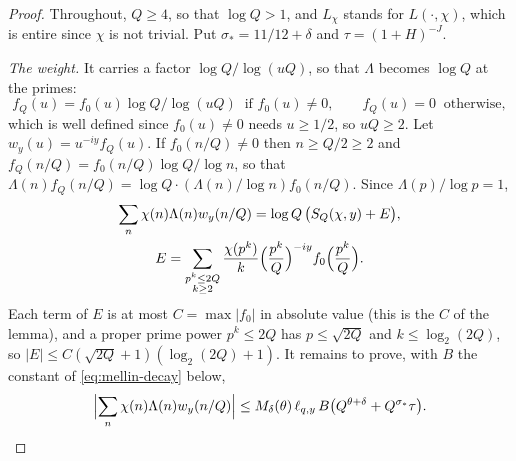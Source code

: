 \documentclass[11pt]{article}
\numberwithin{equation}{section}
\begin{document}
\begin{proof}
Throughout, $Q \ge 4$, so that $\log Q > 1$, and $L_\chi$ stands for $L(\cdot, \chi)$, which is entire since $\chi$ is
not trivial. Put $\sigma_* = 11/12 + \delta$ and $\tau = (1 + H)^{-J}$.

\emph{The weight.} It carries a factor $\log Q/\log(uQ)$, so that $\Lambda$ becomes $\log Q$ at the primes:
\[
  f_Q(u) = f_0(u) \log Q/\log(uQ) \ \text{ if } f_0(u) \ne 0, \qquad f_Q(u) = 0 \ \text{ otherwise},
\]
which is well defined since $f_0(u) \ne 0$ needs $u \ge 1/2$, so $uQ \ge 2$. Let $w_y(u) = u^{-iy} f_Q(u)$. If
$f_0(n/Q) \ne 0$ then $n \ge Q/2 \ge 2$ and $f_Q(n/Q) = f_0(n/Q) \log Q/\log n$, so that
$\Lambda(n) f_Q(n/Q) = \log Q \cdot (\Lambda(n)/\log n) f_0(n/Q)$. Since $\Lambda(p)/\log p = 1$,
\begin{gather*}
  \sum_n \chi(n) \Lambda(n) w_y(n/Q) = \log Q \, \bigl(S_Q(\chi, y) + E\bigr), \\
  E = \sum_{\substack{p^k \le 2Q \\ k \ge 2}} \frac{\chi(p^k)}{k} \Bigl(\frac{p^k}{Q}\Bigr)^{-iy}
  f_0\Bigl(\frac{p^k}{Q}\Bigr).
\end{gather*}
Each term of $E$ is at most $C = \max |f_0|$ in absolute value (this is the $C$ of the lemma), and a proper prime
power $p^k \le 2Q$ has $p \le \sqrt{2Q}$ and $k \le \log_2(2Q)$, so $|E| \le C(\sqrt{2Q} + 1)(\log_2(2Q) + 1)$. It
remains to prove, with $B$ the constant of \eqref{eq:mellin-decay} below,
\begin{equation}\label{eq:Sw-bound}
  \Bigl|\sum_n \chi(n) \Lambda(n) w_y(n/Q)\Bigr| \le M_\delta(\theta) \, \ell_{q, y} \, B \bigl(Q^{\theta + \delta} +
  Q^{\sigma_*} \tau\bigr).
\end{equation}


\end{proof}
\end{document}
